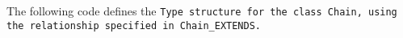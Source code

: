 The following code defines the \tt{Type} structure for the class
\tt{Chain}, using the relationship specified in \tt{Chain_EXTENDS}.

